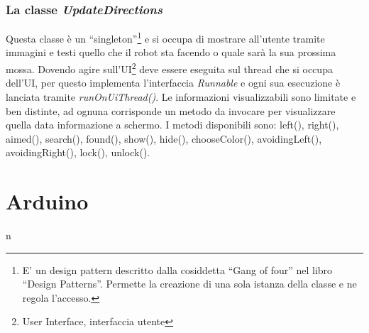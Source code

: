  \subsubsection{La classe \emph{UpdateDirections}}
 Questa classe è un ``singleton''\footnote{E' un design pattern descritto dalla 
 cosiddetta ``Gang of four'' nel libro ``Design Patterns''. 
 Permette la creazione di una sola istanza della classe e ne regola l'accesso. } 
 e si occupa di mostrare all'utente tramite  immagini e testi quello che  il 
 robot sta facendo o quale sarà la sua prossima  mossa. Dovendo agire 
 sull'UI\footnote{User Interface, interfaccia utente} deve essere eseguita sul thread
 che si occupa dell'UI, per questo implementa l'interfaccia \emph{Runnable} e 
 ogni sua esecuzione è lanciata  tramite \emph{runOnUiThread()}. 
 Le informazioni visualizzabili sono limitate e ben distinte,
 ad ognuna corrisponde un metodo da invocare per visualizzare quella data informazione
 a schermo. I metodi disponibili sono: left(), right(), aimed(), search(), 
 found(), show(), hide(), chooseColor(), avoidingLeft(), avoidingRight(), lock(), 
 unlock().

\section {Arduino} n